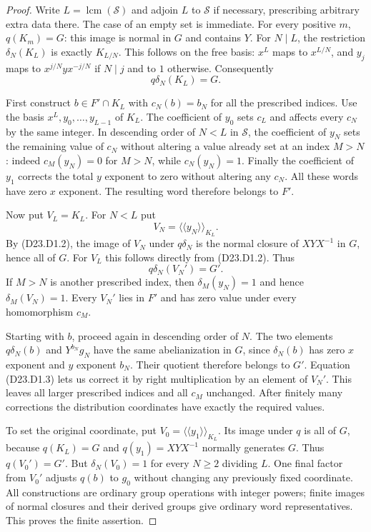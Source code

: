 \begin{proof}
Write $L=\operatorname{lcm}(\mathcal S)$ and adjoin $L$ to
$\mathcal S$ if necessary, prescribing arbitrary extra data there.
The case of an empty set is immediate. For every positive $m$,
$q(K_m)=G$: this image is normal in $G$ and contains $Y$.
For $N\mid L$, the restriction $\delta_N(K_L)$ is exactly
$K_{L/N}$. This follows on the free basis: $x^L$ maps to
$x^{L/N}$, and $y_j$ maps to $x^{j/N}yx^{-j/N}$ if $N\mid j$
and to $1$ otherwise. Consequently
\[
 q\delta_N(K_L)=G.
\tag{D23.D1.2}
\]

First construct $b\in F'\cap K_L$ with $c_N(b)=b_N$ for all
the prescribed indices. Use the basis $x^L,y_0,\ldots,y_{L-1}$
of $K_L$. The coefficient of $y_0$ sets $c_L$ and affects every
$c_N$ by the same integer. In descending order of $N<L$ in
$\mathcal S$, the coefficient of $y_N$ sets the remaining
value of $c_N$ without altering a value already set at an index
$M>N$: indeed $c_M(y_N)=0$ for $M>N$, while $c_N(y_N)=1$.
Finally the coefficient of $y_1$ corrects the total $y$ exponent
to zero without altering any $c_N$. All these words have zero
$x$ exponent. The resulting word therefore belongs to $F'$.

Now put $V_L=K_L$. For $N<L$ put
\[
 V_N=\langle\!\langle y_N\rangle\!\rangle_{K_L}.
\]
By (D23.D1.2), the image of $V_N$ under $q\delta_N$ is the
normal closure of $XYX^{-1}$ in $G$, hence all of $G$.
For $V_L$ this follows directly from (D23.D1.2). Thus
\[
 q\delta_N(V_N')=G'.
\tag{D23.D1.3}
\]
If $M>N$ is another prescribed index, then $\delta_M(y_N)=1$
and hence $\delta_M(V_N)=1$. Every $V_N'$ lies in $F'$ and
has zero value under every homomorphism $c_M$.

Starting with $b$, proceed again in descending order of $N$.
The two elements $q\delta_N(b)$ and $Y^{b_N}g_N$ have the
same abelianization in $G$, since $\delta_N(b)$ has zero
$x$ exponent and $y$ exponent $b_N$. Their quotient therefore
belongs to $G'$. Equation (D23.D1.3) lets us correct it by
right multiplication by an element of $V_N'$. This leaves
all larger prescribed indices and all $c_M$ unchanged.
After finitely many corrections the distribution coordinates
have exactly the required values.

To set the original coordinate, put
$V_0=\langle\!\langle y_1\rangle\!\rangle_{K_L}$.
Its image under $q$ is all of $G$, because $q(K_L)=G$ and
$q(y_1)=XYX^{-1}$ normally generates $G$. Thus $q(V_0')=G'$.
But $\delta_N(V_0)=1$ for every $N\ge2$ dividing $L$.
One final factor from $V_0'$ adjusts $q(b)$ to $g_0$ without
changing any previously fixed coordinate. All constructions
are ordinary group operations with integer powers; finite
images of normal closures and their derived groups give
ordinary word representatives. This proves the finite assertion.


\end{proof}
